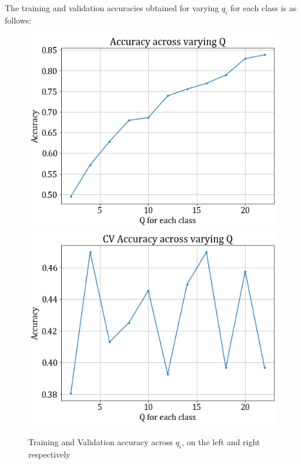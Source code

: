 \documentclass[11pt,a4paper]{article}
\newcommand{\noi}{\noindent}
\begin{document}
\noi
The training and validation accuracies obtained for varying $q_i$ for each class is as follows:
\begin{figure}[H]
    \hspace{-2em}
    \includegraphics[scale=0.5]{images/2A/2A_diag_train_acc.png}
    \includegraphics[scale=0.5]{images/2A/2A_diag_val_acc.png}
    \caption{Training and Validation accuracy across $q_i$, on the left and right respectively}
\end{figure}
\end{document}
